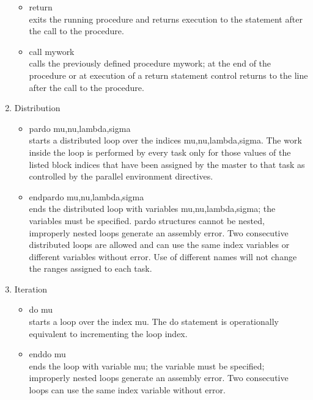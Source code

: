 \documentclass[12pt]{article}
\begin{document}
\begin{enumerate}
\begin{itemize}
  \item return\\ 
exits the running procedure and returns execution to the statement after the call to the 
procedure. 

  \item call mywork\\ 
calls the previously defined procedure mywork; at the end of the procedure or at execution 
of a return statement control returns to the line after the call to the procedure.

\end{itemize} 

\item Distribution\\ 

 \begin{itemize} 

 \item  pardo mu,nu,lambda,sigma\\ 
starts a distributed loop over the indices mu,nu,lambda,sigma. The work inside the loop is 
performed by every task only for those values of the listed block indices that have been 
assigned by the master to that task as controlled by the parallel environment directives.

 \item endpardo mu,nu,lambda,sigma\\ 
ends the distributed loop with variables mu,nu,lambda,sigma; the variables must be specified. 
pardo structures cannot be nested, improperly nested loops generate an assembly error. 
Two consecutive distributed loops are allowed and can use the same index variables or 
different variables without error. Use of different names will not change the ranges assigned 
to each task.

\end{itemize} 

\item Iteration\\ 

\begin{itemize} 
\item do mu\\ 
starts a loop over the index mu. The do statement is operationally equivalent to incrementing 
the loop index.

\item enddo mu\\ 
ends the loop with variable mu; the variable must be specified; improperly nested loops 
generate an assembly error. Two consecutive loops can use the same index variable without error.


\end{itemize}
\end{enumerate}
\end{document}
